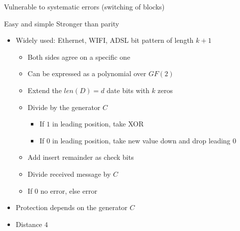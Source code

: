 \begin{itemize}
\begin{itemize}
\begin{itemize}
\begin{itemize}
\begin{itemize}
                                \end{itemize}
                            \icon Vulnerable to systematic errors (switching of blocks)
                        \end{itemize}
                    \ipro Easy and simple
                    \ipro Stronger than parity
                \end{itemize}
                \begin{itemize}
                    \item Widely used: Ethernet, WIFI, ADSL
                     bit pattern of length $k + 1$
                        \begin{itemize}
                            \item Both sides agree on a specific one
                            \item Can be expressed as a polynomial over $GF(2)$
                        \end{itemize}
                        \begin{itemize}
                            \item Extend the $len(D) = d$ date bits with $k$ zeros
                            \item Divide by the generator $C$
                                \begin{itemize}
                                    \item If $1$ in leading position, take XOR
                                    \item If $0$ in leading position, take new value down and drop leading $0$
                                \end{itemize}
                            \item Add insert remainder as check bits
                        \end{itemize}
                        \begin{itemize}
                            \item Divide received message by $C$
                            \item If $0$ no error, else error
                        \end{itemize}
                    \item Protection depends on the generator $C$
                    \item Distance $4$

\end{itemize}
\end{itemize}
\end{itemize}
